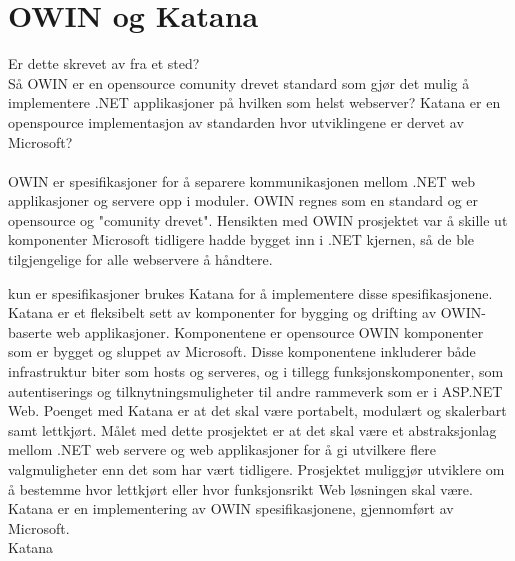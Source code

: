 \section{OWIN og Katana}
\label{sec:teoridel_owinOgKatana}
{\color{blue}Er dette skrevet av fra et sted?}\\
{\color{red}Så OWIN er en opensource comunity drevet standard som gjør det mulig å implementere .NET applikasjoner på hvilken som helst webserver? Katana er en openspource implementasjon av standarden hvor utviklingene er dervet av Microsoft?}
\\
\\
OWIN er spesifikasjoner for å separere kommunikasjonen mellom .NET web applikasjoner og servere opp i moduler. OWIN regnes som en standard og er opensource og "comunity drevet". Hensikten med OWIN prosjektet var å skille ut komponenter Microsoft tidligere hadde bygget inn i .NET kjernen, så de ble tilgjengelige for alle webservere å håndtere. 

kun er spesifikasjoner brukes Katana for å implementere disse spesifikasjonene. Katana er et fleksibelt sett av komponenter for bygging og drifting av OWIN-baserte web applikasjoner. Komponentene er opensource OWIN komponenter som er bygget og sluppet av Microsoft. Disse komponentene inkluderer både infrastruktur biter som hosts og serveres, og i tillegg funksjonskomponenter, som autentiserings og tilknytningsmuligheter til andre rammeverk som er i ASP.NET Web. Poenget med Katana er at det skal være portabelt, modulært og skalerbart samt lettkjørt. Målet med dette prosjektet er at det skal være et abstraksjonlag mellom .NET web servere og web applikasjoner for å gi utvilkere flere valgmuligheter enn det som har vært tidligere. Prosjektet muliggjør utviklere om å bestemme hvor lettkjørt eller hvor funksjonsrikt Web løsningen skal være. Katana er en implementering av OWIN spesifikasjonene, gjennomført av Microsoft. \\

Katana 

